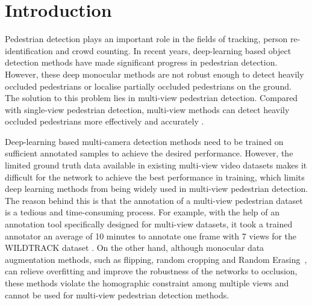 \documentclass[runningheads]{llncs}
\begin{document}
	
	\section{Introduction}




	Pedestrian detection plays an important role in the fields of tracking, person re-identification and crowd counting.
	In recent years, deep-learning based object detection methods have made significant progress in pedestrian detection.
	However, these deep monocular methods are not robust enough to detect heavily occluded pedestrians or localise partially occluded pedestrians on the ground. The solution to this problem lies in multi-view pedestrian detection. Compared with single-view pedestrian detection, multi-view methods can detect heavily occluded pedestrians more effectively and accurately \cite{fleuret2007multicamera}.
	


	Deep-learning based multi-camera detection methods need to be trained on sufficient annotated samples to achieve the desired performance. However, the limited ground truth data available in existing multi-view video datasets makes it difficult for the network to achieve the best performance in training, which limits deep learning methods from being widely used in multi-view pedestrian detection. The reason behind this is that the annotation of a multi-view pedestrian dataset is a tedious and time-consuming process. For example, with the help of an annotation tool specifically designed for multi-view datasets, it took a trained annotator an average of 10 minutes to annotate one frame with 7 views for the WILDTRACK dataset \cite{WILDTRACK_dataset}\cite{chavdarova2018wildtrack}. On the other hand, although monocular data augmentation methods, such as flipping, random cropping and Random Erasing~\cite{zhong2020random}, can relieve overfitting and improve the robustness of the networks to occlusion, these methods violate the homographic constraint among multiple views and cannot be used for multi-view pedestrian detection methods.
\end{document}
